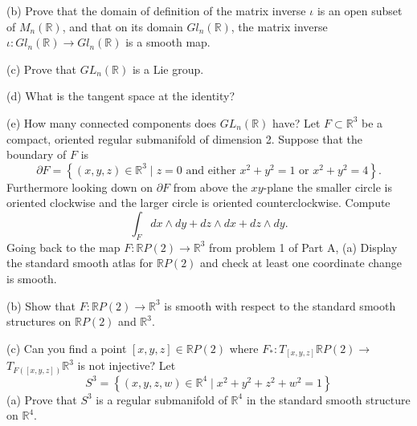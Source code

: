 \documentclass[14pt]{extarticle}
\begin{document}
(b) Prove that the domain of definition of the matrix inverse $\iota$ is an open subset of $M_{n}(\mathbb{R})$, and that on its domain $G l_{n}(\mathbb{R})$, the matrix inverse $\iota: G l_{n}(\mathbb{R}) \rightarrow G l_{n}(\mathbb{R})$ is a smooth map.

(c) Prove that $G L_{n}(\mathbb{R})$ is a Lie group.

(d) What is the tangent space at the identity?

(e) How many connected components does $G L_{n}(\mathbb{R})$ have?
\newpage
Let $F \subset \mathbb{R}^{3}$ be a compact, oriented regular submanifold of dimension 2. Suppose that the boundary of $F$ is
$$
\partial F=\left\{(x, y, z) \in \mathbb{R}^{3} \mid z=0 \text { and either } x^{2}+y^{2}=1 \text { or } x^{2}+y^{2}=4\right\} .
$$
Furthermore looking down on $\partial F$ from above the $x y$-plane the smaller circle is oriented clockwise and the larger circle is oriented counterclockwise. Compute
$$
\int_{F} d x \wedge d y+d z \wedge d x+d z \wedge d y .
$$
\newpage
Going back to the map $F: \mathbb{R} P(2) \rightarrow \mathbb{R}^{3}$ from problem 1 of Part A,
(a) Display the standard smooth atlas for $\mathbb{R} P(2)$ and check at least one coordinate change is smooth.

(b) Show that $F: \mathbb{R} P(2) \rightarrow \mathbb{R}^{3}$ is smooth with respect to the standard smooth structures on $\mathbb{R} P(2)$ and $\mathbb{R}^{3}$.

(c) Can you find a point $[x, y, z] \in \mathbb{R} P(2)$ where $F_{*}: T_{[x, y, z]} \mathbb{R} P(2) \rightarrow$ $T_{F([x, y, z])} \mathbb{R}^{3}$ is not injective?
\newpage
Let
$$
S^{3}=\left\{(x, y, z, w) \in \mathbb{R}^{4} \mid x^{2}+y^{2}+z^{2}+w^{2}=1\right\}
$$
(a) Prove that $S^{3}$ is a regular submanifold of $\mathbb{R}^{4}$ in the standard smooth structure on $\mathbb{R}^{4}$.
\end{document}
